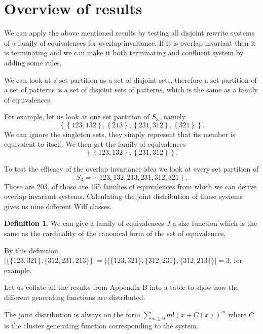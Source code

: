 \documentclass[a4paper, 11pt, english]{article}
\theoremstyle{definition}
\newtheorem{definition}[theorem]{Definition}
\newcommand{\Sym}{S}
\begin{document}
\section{Overview of results}
We can apply the above mentioned results by testing all disjoint rewrite systems of a
family of equivalences for overlap invariance. If it is overlap invariant then it is terminating and
we can make it both terminating and confluent system by adding some rules.

We can look at a set partition as a set of disjoint sets, therefore a set partition of a set of
patterns is a set of disjoint sets of patterns, which is the same as a family of
equivalences.

For example, let us look at one set partition of $\Sym_3$, namely 
\[
  \left\{ \left\{ 123, 132 \right\}, \left\{ 213 \right\}, \left\{ 231, 312 \right\}, \left\{ 321
  \right\} \right\}.
\]
We can ignore the singleton sets, they simply represent that its member is equivalent to itself. We
then get the family of equivalences
\[
  \left\{ \left\{ 123, 132 \right\}, \left\{ 231, 312 \right\} \right\}.
\]


To test the efficacy of the overlap invariance idea we look at every set partition of 
\[
  \Sym_3 = \left\{ 123, 132, 213, 231, 312, 321 \right\}.
\]
Those are 203, of those are 155 families of equivalences from which we can derive overlap
invariant systems.
Calculating the joint distribution of those systems gives us nine different Wilf classes.

\begin{definition}
    We can give a family of equivalences $J$ a size function which is the same
    as the cardinality of the canonical form of the set of equivalences.

    By this definition $| \{ \{ 123, 321 \}, \{ 312, 231, 213 \} \}| = | \{ \{
    123, 321 \}, \{ 312, 231 \}, \{ 312, 213 \} \} | = 3$, for example.
\end{definition}

Let us collate all the results from Appendix B into a table to show how the
different generating functions are distributed.

The joint distribution is always on the form $\sum_{m \geq 0}m!(x+C(x))^m$ where $C$
is the cluster generating function corresponding to the system.
\end{document}
